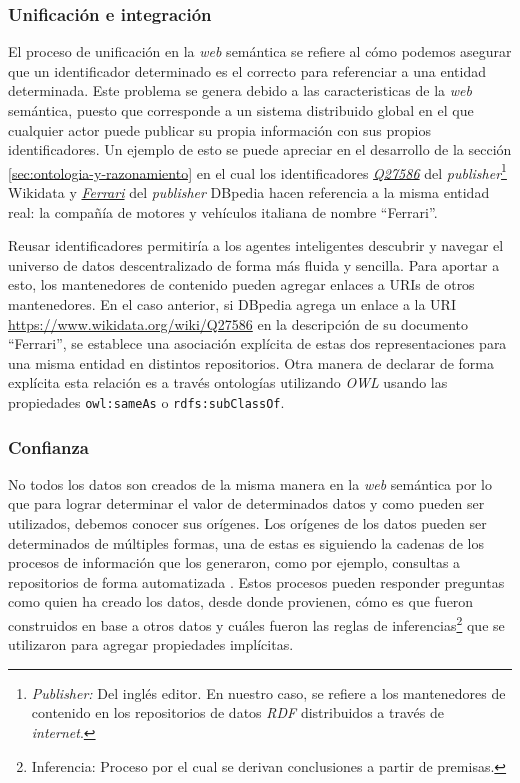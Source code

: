 \subsubsection{Unificación e integración}

El proceso de unificación en la \textit{web} semántica se refiere al cómo podemos asegurar
que un identificador determinado es el correcto para referenciar a una entidad
determinada. Este problema se genera debido a las caracteristicas de la
\textit{web} semántica, puesto que corresponde a un sistema distribuido global
en el que cualquier actor puede publicar su propia información con sus propios
identificadores. Un ejemplo de esto se puede apreciar en el desarrollo de la
sección \ref{sec:ontologia-y-razonamiento} en el cual los identificadores
\href{https://www.wikidata.org/wiki/Q27586}{\textit{Q27586}} del
\textit{publisher}\footnote{\textit{Publisher:} Del inglés editor. En nuestro
caso, se refiere a los mantenedores de contenido en los repositorios de datos
\textit{RDF} distribuidos a través de \textit{internet}.} Wikidata y
\href{http://dbpedia.org/page/Ferrari}{\textit{Ferrari}} del \textit{publisher}
DBpedia hacen referencia a la misma entidad real: la compañía de motores y
vehículos italiana de nombre ``Ferrari''.

Reusar identificadores permitiría a los agentes inteligentes descubrir y navegar
el universo de datos descentralizado de forma más fluida y sencilla. Para
aportar a esto, los mantenedores de contenido pueden agregar enlaces a URIs de
otros mantenedores. En el caso anterior, si DBpedia agrega un enlace a la URI
\url{https://www.wikidata.org/wiki/Q27586} en la descripción de su documento
``Ferrari'', se establece una asociación explícita de estas dos representaciones
para una misma entidad en distintos repositorios. Otra manera de declarar de
forma explícita esta relación es a través ontologías utilizando \textit{OWL}
usando las propiedades \texttt{owl:sameAs} o \texttt{rdfs:subClassOf}.

\subsubsection{Confianza}

No todos los datos son creados de la misma manera en la \textit{web} semántica
por lo que para lograr determinar el valor de determinados datos y como pueden
ser utilizados, debemos conocer sus orígenes. Los orígenes de los
datos pueden ser determinados de múltiples formas, una de estas es siguiendo la
cadenas de los procesos de información que los generaron, como por ejemplo, consultas a repositorios
de forma automatizada \cite{dividino2009querying} \cite{flouris2009coloring}.
Estos procesos pueden responder preguntas como quien ha creado los datos, desde
donde provienen, cómo es que fueron construidos en base a otros datos y cuáles
fueron las reglas de inferencias\footnote{Inferencia: Proceso por el cual se
derivan conclusiones a partir de premisas.} que se utilizaron para agregar
propiedades implícitas.

